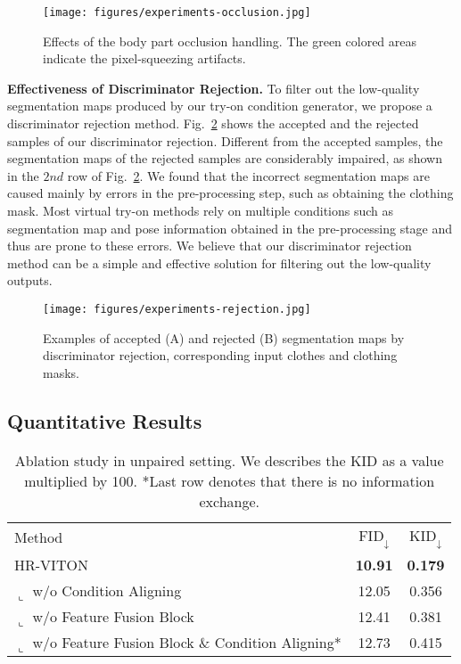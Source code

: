 \begin{figure}[t!]
    \centering
    \texttt{[image: figures/experiments-occlusion.jpg]}
    \caption{Effects of the body part occlusion handling. The green colored areas indicate the pixel-squeezing artifacts.}
    \label{fig:occlusion}
    \vspace{0.5cm}
\end{figure}


\noindent\textbf{Effectiveness of Discriminator Rejection.}
To filter out the low-quality segmentation maps produced by our try-on condition generator, we propose a discriminator rejection method.
Fig.~\ref{fig:rejection} shows the accepted and the rejected samples of our discriminator rejection.
Different from the accepted samples, the segmentation maps of the rejected samples are considerably impaired, as shown in the $2nd$ row of Fig.~\ref{fig:rejection}.
We found that the incorrect segmentation maps are caused mainly by errors in the pre-processing step, such as obtaining the clothing mask.
Most virtual try-on methods rely on multiple conditions such as segmentation map and pose information obtained in the pre-processing stage and thus are prone to these errors.
We believe that our discriminator rejection method can be a simple and effective solution for filtering out the low-quality outputs.





\begin{figure}[t!]
    \texttt{[image: figures/experiments-rejection.jpg]}
    \caption{Examples of accepted (A) and rejected (B) segmentation maps by discriminator rejection, corresponding input clothes and clothing masks.}
    \label{fig:rejection}
\end{figure}


\subsection{Quantitative Results}
\begin{table}[b!]
    \centering
    \footnotesize
    \begin{tabular}{l|cc}
    \toprule
    Method & FID$_{\downarrow}$ & KID$_{\downarrow}$  \\ 
    \cmidrule(lr){1-3}
    HR-VITON & \textbf{10.91} & \textbf{0.179} \\ 
    $\llcorner$ w/o Condition Aligning                     & 12.05 & 0.356 \\
    $\llcorner$ w/o Feature Fusion Block                        & 12.41 & 0.381 \\
    $\llcorner$ w/o Feature Fusion Block \& Condition Aligning*     & 12.73 & 0.415 \\
    \bottomrule
    \end{tabular}
    \caption{Ablation study in unpaired setting. We describes the KID as a value multiplied by 100. *Last row denotes that there is no information exchange.}
    
    \label{table:ablation}
\end{table}


